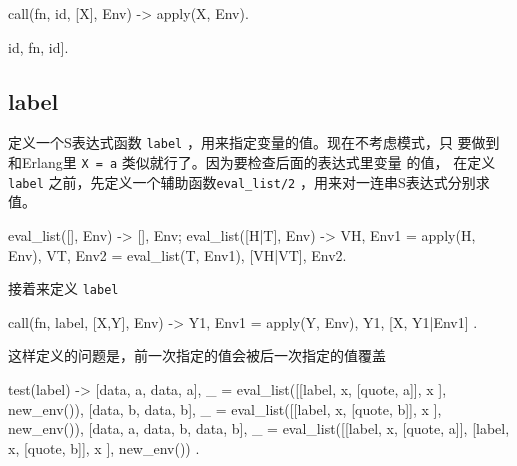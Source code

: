 \documentclass[preview,multi,crop=false,border=1in,class=memoir]{standalone}
\begin{document}
\begin{preview-page}
\begin{Exercise}[title={id},difficulty=1]
\end{Exercise}

\begin{Answer}

\begin{SourceCode}
call({fn, id}, [X], Env) ->
    apply(X, Env).
\end{SourceCode}

\begin{SourceCode}
     {id,    {fn, id}}].
\end{SourceCode}

\end{Answer}


\subsection{label}

定义一个S表达式函数 \verb|label| ，用来指定变量的值。现在不考虑模式，只
要做到和Erlang里 \verb|X = a| 类似就行了。因为要检查后面的表达式里变量
的值， 在定义 \verb|label| 之前，先定义一个辅助函数\verb|eval_list/2|
，用来对一连串S表达式分别求值。


\begin{SourceCode}
eval_list([], Env) ->
    {[], Env};
eval_list([H|T], Env) ->
    {VH, Env1} = apply(H, Env),
    {VT, Env2} = eval_list(T, Env1),
    {[VH|VT], Env2}.
\end{SourceCode}

接着来定义 \verb|label|

\begin{SourceCode}
call({fn, label}, [X,Y], Env) ->
    {Y1, Env1} = apply(Y, Env),
    {Y1, [{X, Y1}|Env1]}
.
\end{SourceCode}

这样定义的问题是，前一次指定的值会被后一次指定的值覆盖

\begin{SourceCode}
test(label) ->
    {[{data, a}, {data, a}], _} =
        eval_list([[label, x, [quote, a]],
                   x
                  ], new_env()),
    {[{data, b}, {data, b}], _} =
        eval_list([[label, x, [quote, b]],
                   x
                  ], new_env()),
    {[{data, a}, {data, b}, {data, b}], _} =
        eval_list([[label, x, [quote, a]],
                   [label, x, [quote, b]],
                   x
                  ], new_env())
.
\end{SourceCode}


\end{preview-page}
\end{document}
